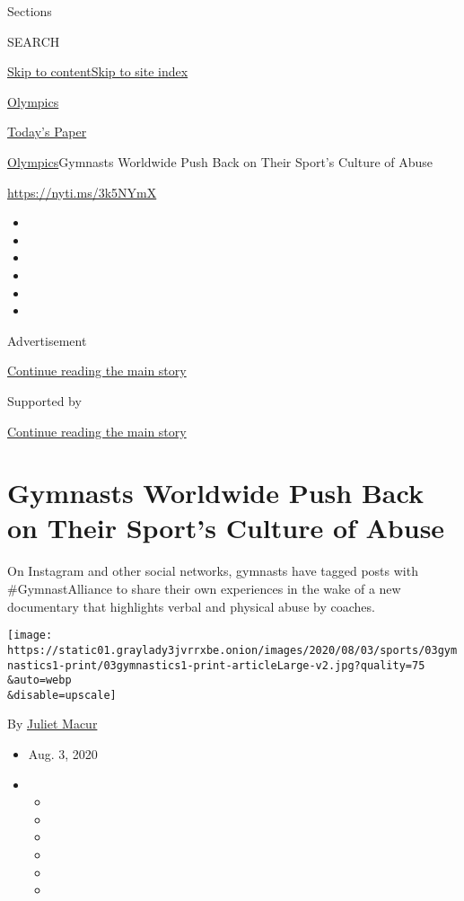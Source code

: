 Sections

SEARCH

\protect\hyperlink{site-content}{Skip to
content}\protect\hyperlink{site-index}{Skip to site index}

\href{https://www.nytimes3xbfgragh.onion/section/sports/olympics}{Olympics}

\href{https://myaccount.nytimes3xbfgragh.onion/auth/login?response_type=cookie\&client_id=vi}{}

\href{https://www.nytimes3xbfgragh.onion/section/todayspaper}{Today's
Paper}

\href{/section/sports/olympics}{Olympics}\textbar{}Gymnasts Worldwide
Push Back on Their Sport's Culture of Abuse

\url{https://nyti.ms/3k5NYmX}

\begin{itemize}
\item
\item
\item
\item
\item
\item
\end{itemize}

Advertisement

\protect\hyperlink{after-top}{Continue reading the main story}

Supported by

\protect\hyperlink{after-sponsor}{Continue reading the main story}

\hypertarget{gymnasts-worldwide-push-back-on-their-sports-culture-of-abuse}{%
\section{Gymnasts Worldwide Push Back on Their Sport's Culture of
Abuse}\label{gymnasts-worldwide-push-back-on-their-sports-culture-of-abuse}}

On Instagram and other social networks, gymnasts have tagged posts with
\#GymnastAlliance to share their own experiences in the wake of a new
documentary that highlights verbal and physical abuse by coaches.

\texttt{[image: https://static01.graylady3jvrrxbe.onion/images/2020/08/03/sports/03gymnastics1-print/03gymnastics1-print-articleLarge-v2.jpg?quality=75\\\&auto=webp\\\&disable=upscale]}

By \href{https://www.nytimes3xbfgragh.onion/by/juliet-macur}{Juliet
Macur}

\begin{itemize}
\item
  Aug. 3, 2020
\item
  \begin{itemize}
  \item
  \item
  \item
  \item
  \item
  \item
  \end{itemize}
\end{itemize}


